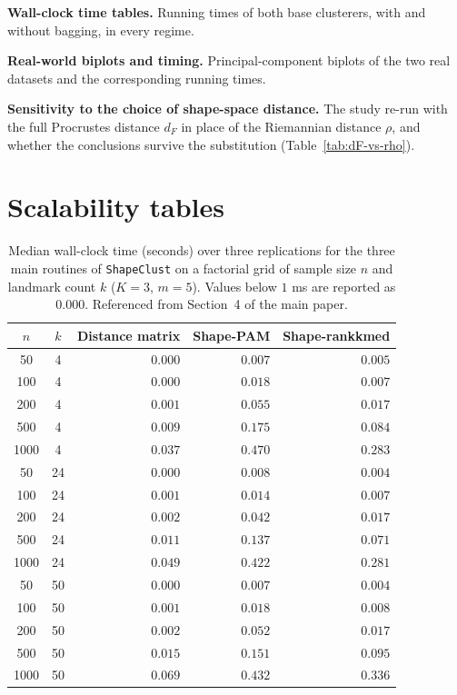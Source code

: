 \documentclass[11pt,a4paper]{article}
\begin{document}
\begin{description}[leftmargin=2.1cm, style=nextline]
\item[Section S.6] \textbf{Wall-clock time tables.} Running times of both base
  clusterers, with and without bagging, in every regime.

\item[Section S.7] \textbf{Real-world biplots and timing.} Principal-component
  biplots of the two real datasets and the corresponding running times.

\item[Section S.8] \textbf{Sensitivity to the choice of shape-space distance.}
  The study re-run with the full Procrustes distance $d_F$ in place of the
  Riemannian distance $\rho$, and whether the conclusions survive the
  substitution (Table~\ref{tab:dF-vs-rho}).

\end{description}

\clearpage

\section{Scalability tables}
\label{sec:scal}

\begin{table}[h]
\centering
\caption{Median wall-clock time (seconds) over three replications for the
  three main routines of \texttt{ShapeClust} on a factorial grid of sample
  size $n$ and landmark count $k$ ($K=3$, $m=5$). Values below $1$ ms are
  reported as $0.000$. Referenced from Section~4 of the main paper.}
\label{tab:scal-nk}
\small
\begin{tabular}{cc rrr}
\toprule
$n$ & $k$ & Distance matrix & Shape-PAM & Shape-rankkmed \\
\midrule
  50 &  4 & $0.000$ & $0.007$ & $0.005$ \\
 100 &  4 & $0.000$ & $0.018$ & $0.007$ \\
 200 &  4 & $0.001$ & $0.055$ & $0.017$ \\
 500 &  4 & $0.009$ & $0.175$ & $0.084$ \\
1000 &  4 & $0.037$ & $0.470$ & $0.283$ \\
\midrule
  50 & 24 & $0.000$ & $0.008$ & $0.004$ \\
 100 & 24 & $0.001$ & $0.014$ & $0.007$ \\
 200 & 24 & $0.002$ & $0.042$ & $0.017$ \\
 500 & 24 & $0.011$ & $0.137$ & $0.071$ \\
1000 & 24 & $0.049$ & $0.422$ & $0.281$ \\
\midrule
  50 & 50 & $0.000$ & $0.007$ & $0.004$ \\
 100 & 50 & $0.001$ & $0.018$ & $0.008$ \\
 200 & 50 & $0.002$ & $0.052$ & $0.017$ \\
 500 & 50 & $0.015$ & $0.151$ & $0.095$ \\
1000 & 50 & $0.069$ & $0.432$ & $0.336$ \\
\bottomrule
\end{tabular}
\end{table}
\end{document}
